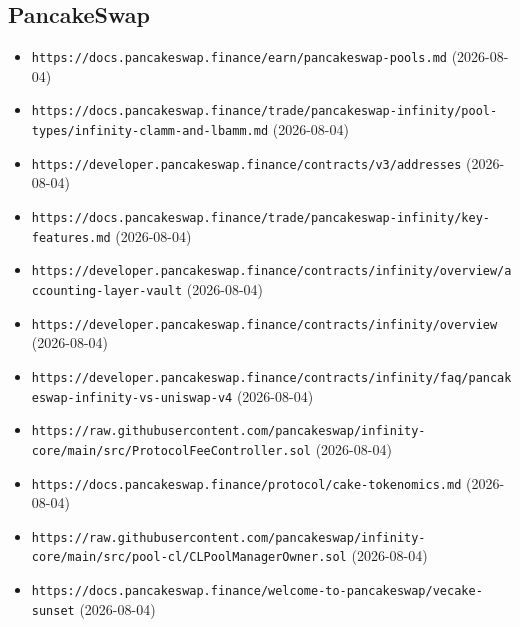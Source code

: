 \subsection*{PancakeSwap}
\begin{itemize}\setlength{\itemsep}{0pt}\small
\item \texttt{https://docs.pancakeswap.finance/earn/pancakeswap-pools.md} (2026-08-04)
\item \texttt{https://docs.pancakeswap.finance/trade/pancakeswap-infinity/pool-types/infinity-clamm-and-lbamm.md} (2026-08-04)
\item \texttt{https://developer.pancakeswap.finance/contracts/v3/addresses} (2026-08-04)
\item \texttt{https://docs.pancakeswap.finance/trade/pancakeswap-infinity/key-features.md} (2026-08-04)
\item \texttt{https://developer.pancakeswap.finance/contracts/infinity/overview/accounting-layer-vault} (2026-08-04)
\item \texttt{https://developer.pancakeswap.finance/contracts/infinity/overview} (2026-08-04)
\item \texttt{https://developer.pancakeswap.finance/contracts/infinity/faq/pancakeswap-infinity-vs-uniswap-v4} (2026-08-04)
\item \texttt{https://raw.githubusercontent.com/pancakeswap/infinity-core/main/src/ProtocolFeeController.sol} (2026-08-04)
\item \texttt{https://docs.pancakeswap.finance/protocol/cake-tokenomics.md} (2026-08-04)
\item \texttt{https://raw.githubusercontent.com/pancakeswap/infinity-core/main/src/pool-cl/CLPoolManagerOwner.sol} (2026-08-04)
\item \texttt{https://docs.pancakeswap.finance/welcome-to-pancakeswap/vecake-sunset} (2026-08-04)
\end{itemize}

